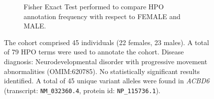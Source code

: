 \begin{figure}[htbp]
\vspace{2em}

\begin{subfigure}[b]{0.95\textwidth}
\centering
{}
\captionsetup{justification=raggedright,singlelinecheck=false}
\caption{Fisher Exact Test performed to compare HPO annotation frequency with respect to FEMALE and MALE.}
\end{subfigure}

\vspace{2em}

\caption{The cohort comprised 45 individuals (22 females, 23 males). A total of 79 HPO terms were used to annotate the cohort. Disease diagnosis: Neurodevelopmental disorder with progressive movement abnormalities (OMIM:620785). No statistically significant results identified. A total of 45 unique variant alleles were found in \textit{ACBD6} (transcript: \texttt{NM\_032360.4}, protein id: \texttt{NP\_115736.1}).}
\end{figure}
